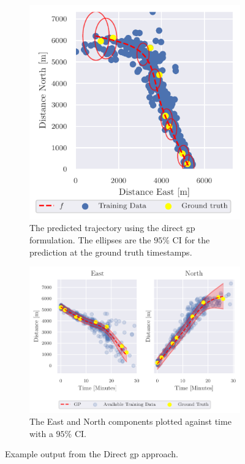\begin{figure}
    \centering
    \begin{subfigure}{\textwidth}
        \centering
        \includegraphics{figures/direct_gp_example.pdf}
        \caption{The predicted trajectory using the direct \acrshort{gp} formulation. The ellipses are the $95\%$ CI for the prediction at the ground truth timestamps.}
    \end{subfigure}
        \begin{subfigure}{\textwidth}
        \centering
        \includegraphics{figures/direct_gp_state_example.pdf}
        \caption{The East and North components plotted against time with a $95\%$ CI.}
    \end{subfigure}
    \caption{Example output from the Direct \acrshort{gp} approach. }
    \label{fig:direct_gp_example}
\end{figure}